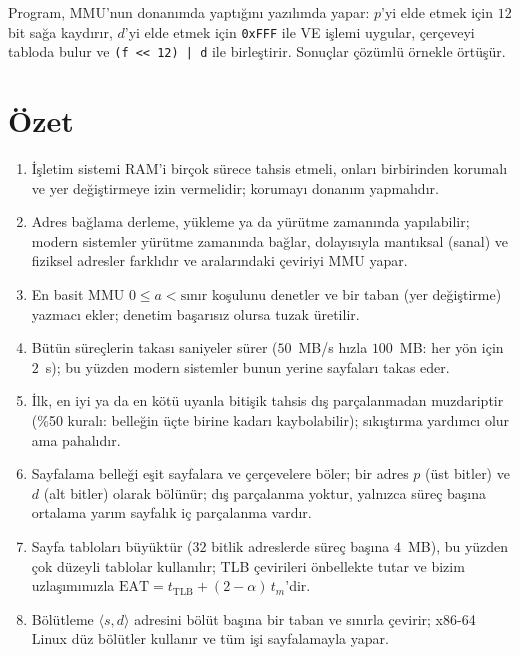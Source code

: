 Program, MMU'nun donanımda yaptığını yazılımda yapar: $p$'yi elde etmek için $12$ bit sağa kaydırır, $d$'yi elde etmek için \texttt{0xFFF} ile VE işlemi uygular, çerçeveyi tabloda bulur ve \texttt{(f << 12) | d} ile birleştirir. Sonuçlar çözümlü örnekle örtüşür.

\section{Özet}

\begin{keyidea}
\begin{enumerate}[leftmargin=1.4em]
  \item İşletim sistemi RAM'i birçok sürece tahsis etmeli, onları birbirinden korumalı ve yer değiştirmeye izin vermelidir; korumayı donanım yapmalıdır.
  \item Adres bağlama derleme, yükleme ya da yürütme zamanında yapılabilir; modern sistemler yürütme zamanında bağlar, dolayısıyla mantıksal (sanal) ve fiziksel adresler farklıdır ve aralarındaki çeviriyi MMU yapar.
  \item En basit MMU $0 \le a < \text{sınır}$ koşulunu denetler ve bir taban (yer değiştirme) yazmacı ekler; denetim başarısız olursa tuzak üretilir.
  \item Bütün süreçlerin takası saniyeler sürer ($50$~MB/s hızla $100$~MB: her yön için $2$~s); bu yüzden modern sistemler bunun yerine sayfaları takas eder.
  \item İlk, en iyi ya da en kötü uyanla bitişik tahsis dış parçalanmadan muzdariptir (\%50 kuralı: belleğin üçte birine kadarı kaybolabilir); sıkıştırma yardımcı olur ama pahalıdır.
  \item Sayfalama belleği eşit sayfalara ve çerçevelere böler; bir adres $p$ (üst bitler) ve $d$ (alt bitler) olarak bölünür; dış parçalanma yoktur, yalnızca süreç başına ortalama yarım sayfalık iç parçalanma vardır.
  \item Sayfa tabloları büyüktür ($32$ bitlik adreslerde süreç başına $4$~MB), bu yüzden çok düzeyli tablolar kullanılır; TLB çevirileri önbellekte tutar ve bizim uzlaşımımızla $\text{EAT} = t_{\text{TLB}} + (2-\alpha)\,t_{m}$'dir.
  \item Bölütleme $\langle s, d\rangle$ adresini bölüt başına bir taban ve sınırla çevirir; x86-64 Linux düz bölütler kullanır ve tüm işi sayfalamayla yapar.
\end{enumerate}
\end{keyidea}

